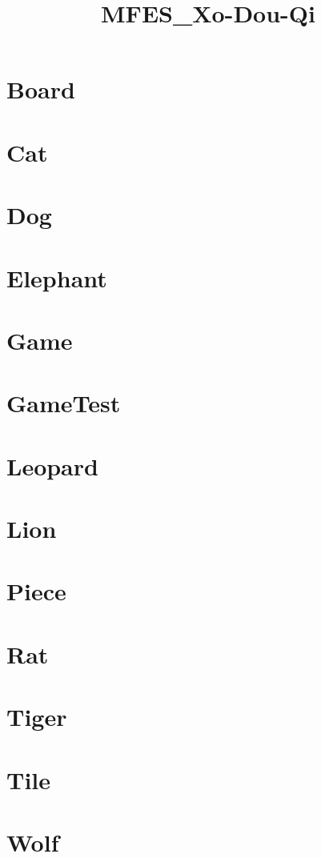 \documentclass{article}
\begin{document}
\title{MFES\_Xo-Dou-Qi}
\author{}
\maketitle
\tableofcontents

\section{Board}

\section{Cat}

\section{Dog}

\section{Elephant}

\section{Game}

\section{GameTest}

\section{Leopard}

\section{Lion}

\section{Piece}

\section{Rat}

\section{Tiger}

\section{Tile}

\section{Wolf}

\end{document}
